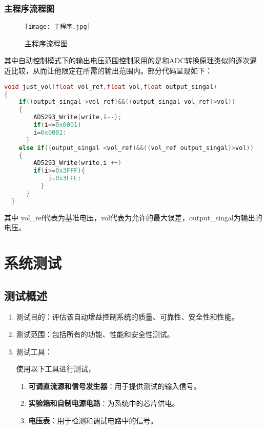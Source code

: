 \documentclass[lang=cn,11pt,a4paper]{elegantpaper}
\begin{document}
\subsubsection{主程序流程图}
\begin{figure}[!htb]
  \centering
  \texttt{[image: 主程序.jpg]}
  \caption{主程序流程图}
  \label{fig:主程序流程图}
\end{figure}

其中自动控制模式下的输出电压范围控制采用的是和ADC转换原理类似的逐次逼近比较，从而让他限定在所需的输出范围内。部分代码呈现如下：
\begin{lstlisting}[language=C,caption={主程序部分代码},label={code:zhu}]
void just_vol(float vol_ref,float vol,float output_singal)
{
    if((output_singal >vol_ref)&&((output_singal-vol_ref)>vol))
    {
        AD5293_Write(write,i--);
        if(i<=0x0001)
        i=0x0002:
      }
    else if((output_singal <vol_ref)&&((vol_ref output_singal)>vol))
    {
        AD5293_Write(write,i ++)
        if(i>=0x3FFF){
            i=0x3FFE:
          }
      }
  }
  \end{lstlisting}
其中 vol\_ref代表为基准电压，vol代表为允许的最大误差，output\_singal为输出的电压。

\section{系统测试}

\subsection{测试概述}
\begin{enumerate}
  \item 测试目的：评估该自动增益控制系统的质量、可靠性、安全性和性能。

  \item 测试范围：包括所有的功能、性能和安全性测试。

  \item 测试工具：

        使用以下工具进行测试，
        \begin{enumerate}
          \item \textbf{可调直流源和信号发生器}：用于提供测试的输入信号。
          \item \textbf{实验箱和自制电源电路}：为系统中的芯片供电。
          \item \textbf{电压表}：用于检测和调试电路中的信号。
        \end{enumerate}

\end{enumerate}
\end{document}
